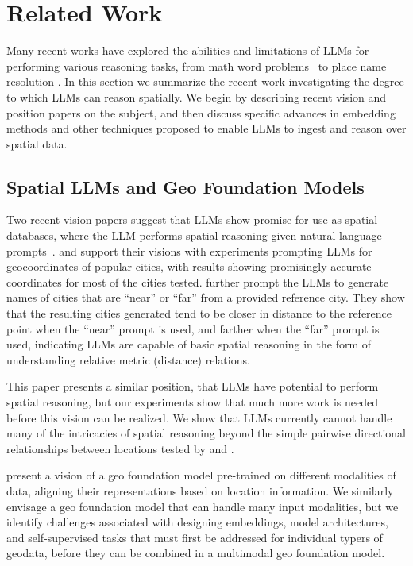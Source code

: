 \section{Related Work}
\label{section:related}
\normalsize

Many recent works have explored the abilities and limitations of LLMs for performing various reasoning tasks, from math word problems~\cite{Gao2023, Badaro2023} to place name resolution \cite{Mai2023}.
In this section we summarize the recent work investigating the degree to which LLMs can reason spatially.
We begin by describing recent vision and position papers on the subject, and then discuss specific advances in embedding methods and other techniques proposed to enable LLMs to ingest and reason over spatial data.


\subsection{Spatial LLMs and Geo Foundation Models}
Two recent vision papers suggest that LLMs show promise for use as spatial databases, where the LLM performs spatial reasoning given natural language prompts~\cite{Bhandari2023, Qi2023}.
\citeauthor{Bhandari2023} and \citeauthor{Qi2023} support their visions with experiments prompting LLMs for geocoordinates of popular cities, with results showing promisingly accurate coordinates for most of the cities tested.
\citeauthor{Bhandari2023} further prompt the LLMs to generate names of cities that are ``near'' or ``far'' from a provided reference city.
They show that the resulting cities generated tend to be closer in distance to the reference point when the ``near'' prompt is used, and farther when the ``far'' prompt is used, indicating LLMs are capable of basic spatial reasoning in the form of understanding relative metric (distance) relations.

This paper presents a similar position, that LLMs have potential to perform spatial reasoning, but our experiments show that much more work is needed before this vision can be realized.
We show that LLMs currently cannot handle many of the intricacies of spatial reasoning beyond the simple pairwise directional relationships between locations tested by \citeauthor{Bhandari2023} and \citeauthor{Qi2023}.

\citeauthor{Mai2023} present a vision of a geo foundation model pre-trained on different modalities of data, aligning their representations based on location information.
We similarly envisage a geo foundation model that can handle many input modalities, but we identify challenges associated with designing embeddings, model architectures, and self-supervised tasks that must first be addressed for individual typers of geodata, before they can be combined in a multimodal geo foundation model.

